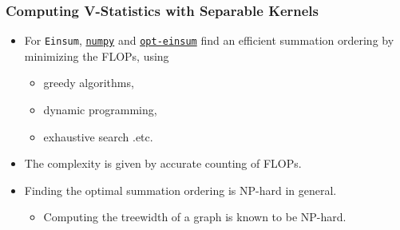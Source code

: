 \documentclass[9pt]{beamer}
\theoremstyle{mystyle}
\theoremstyle{mystyletwo}
\newcommand{\libref}[2]{\href{#2}{\texttt{#1}}}
\newcommand{\numpy}{\libref{numpy}{https://numpy.org/}}
\newcommand{\opteinsum}{\libref{opt-einsum}{https://dgasmith.github.io/opt_einsum/}}
\begin{document}
\begin{frame}
    \frametitle{Computing V-Statistics with Separable Kernels}
    \begin{itemize}
    \setlength\itemsep{1.5em}
        \item For \texttt{Einsum}, \numpy{} and \opteinsum{} find an efficient summation ordering by minimizing the FLOPs, using
        \vspace{1.5em}
              \begin{itemize}
            \setlength\itemsep{1.5em}
                  \item greedy algorithms,
                  \item dynamic programming, 
                  \item exhaustive search .etc.
              \end{itemize}
        \item The complexity is given by accurate counting of FLOPs.
        \item Finding the optimal summation ordering is NP-hard in general.
              \begin{itemize}
                  \item Computing the treewidth of a graph is known to be NP-hard.
              \end{itemize}
    \end{itemize}
\end{frame}
\end{document}

